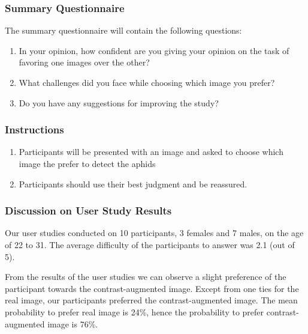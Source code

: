 \documentclass{article}
\begin{document}
\subsubsection{Summary Questionnaire}
The summary questionnaire will contain the following questions: 

\begin{enumerate}
    \item In your opinion, how confident are you giving your opinion on the task of favoring one
    images over the other?    
    \item What challenges did you face while choosing which image you prefer?
    \item Do you have any suggestions for improving the study?
\end{enumerate}

\subsubsection{Instructions}
\begin{enumerate}
    \item Participants will be presented with an image and asked to choose which image the prefer to detect the aphids
    \item Participants should use their best judgment and be reassured.
\end{enumerate}

\subsubsection{Discussion on User Study Results}
Our user studies conducted on 10 participants, 3 females and 7 males, on the age of 22 to 31.
The average difficulty of the participants to answer was 2.1 (out of 5).

From the results of the user studies we can observe a slight preference of the participant
towards the contrast-augmented image. Except from one ties for the real image, our participants
preferred the contrast-augmented image. The mean probability to prefer real image is
24\%, hence the probability to prefer contrast-augmented image is 76\%.

\newpage


\end{document}
